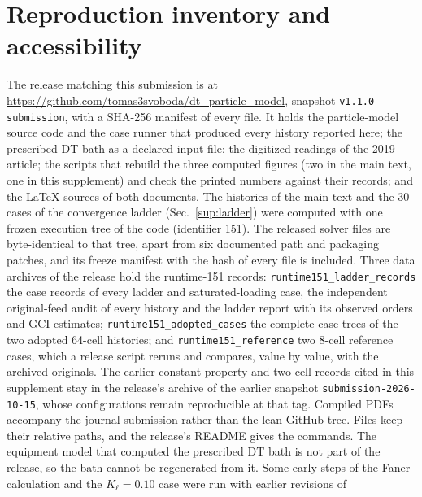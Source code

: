 \documentclass[11pt]{article}
\begin{document}








\section{Reproduction inventory and accessibility}
\label{sup:deposit}
The release matching this submission is at
\url{https://github.com/tomas3svoboda/dt_particle_model}, snapshot
\texttt{v1.1.0-submission}, with a SHA-256 manifest of every file. It holds
the particle-model source code and the case runner that produced every
history reported here; the prescribed DT bath as a declared input file; the
digitized readings of the 2019 article; the scripts that rebuild the three
computed figures (two in the main text, one in this supplement) and check
the printed numbers against their records; and the LaTeX sources of both
documents. The histories of the main text and the 30 cases of the
convergence ladder (Sec.~\ref{sup:ladder}) were computed with one frozen
execution tree of the code (identifier 151). The released solver files are
byte-identical to that tree, apart from six documented path and packaging
patches, and its freeze manifest with the hash of every file is included.
Three data archives of the release hold the runtime-151 records:
\texttt{runtime151\_ladder\_records} the case records of every ladder and
saturated-loading case, the independent original-feed audit of every
history and the ladder report with its observed orders and GCI estimates;
\texttt{runtime151\_adopted\_cases} the complete case trees of the two
adopted 64-cell histories; and \texttt{runtime151\_reference} two 8-cell
reference cases, which a release script reruns and compares, value by
value, with the archived originals. The earlier constant-property and
two-cell records cited in this supplement stay in the release's archive
of the earlier snapshot \texttt{submission-2026-10-15}, whose
configurations remain reproducible at that tag. Compiled PDFs accompany the
journal submission rather than the lean GitHub tree. Files keep their relative paths, and the release's
README gives the commands. The equipment
model that computed the prescribed DT bath is not part of the release, so
the bath cannot be regenerated from it. Some early steps of the Faner
calculation and the $K_\ell=0.10$ case were run with earlier revisions of
\end{document}
